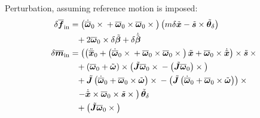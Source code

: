 \documentclass[10pt,dvips,fleqn,subeqn]{report}
\newcommand{\T}[1]{\bm{#1}}
\newcommand{\TT}[1]{\bm{#1}}
\begin{document}
Perturbation, assuming reference motion is imposed:
\begin{subequations}
\begin{align}
	\delta\overline{\T{f}}_{\text{in}}
	&= \plbr{
		\dot{\overline{\T{\omega}}}_0 \times{}
		+ \overline{\T{\omega}}_0 \times \overline{\T{\omega}}_0 \times{}
	} \plbr{
		m \delta\tilde{\T{x}}
		- \tilde{\T{s}} \times \tilde{\T{\theta}}_{\delta}
	}
	\noindent \\
	&\hphantom{=}+ 2 \overline{\T{\omega}}_0 \times \delta\tilde{\T{\beta}}
	+ \delta \dot{\tilde{\T{\beta}}} \\
%
	\delta\overline{\T{m}}_{\text{in}}
	&= \lplbr{
		\plbr{
			\ddot{\overline{\T{x}}}_0
			+ \plbr{
				\dot{\overline{\T{\omega}}}_0 \times{}
				+ \overline{\T{\omega}}_0 \times \overline{\T{\omega}}_0 \times{}
			} \tilde{\T{x}}
			+ \overline{\T{\omega}}_0 \times \dot{\tilde{\T{x}}}
		} \times \tilde{\T{s}} \times{}
	} \nonumber \\
	&\hphantom{=}
		+ \plbr{
			\overline{\T{\omega}}_0
			+ \tilde{\T{\omega}}
		} \times \plbr{
			\tilde{\TT{J}} \overline{\T{\omega}}_0 \times{}
			- \plbr{\tilde{\TT{J}} \overline{\T{\omega}}_0} \times{}
		}
	\nonumber \\
	&\hphantom{=}
		+ \tilde{\TT{J}} \plbr{
			\dot{\overline{\T{\omega}}}_0
			+ \overline{\T{\omega}}_0 \times \tilde{\T{\omega}}
		} \times{}
		- \plbr{\tilde{\TT{J}} \plbr{
			\dot{\overline{\T{\omega}}}_0
			+ \overline{\T{\omega}}_0 \times \tilde{\T{\omega}}
		}} \times{}
	\nonumber \\
	&\hphantom{=}
	\rplbr{
		- \dot{\tilde{\T{x}}} \times \overline{\T{\omega}}_0 \times \tilde{\T{s}} \times{}
	} \tilde{\T{\theta}}_{\delta}
	\nonumber \\
	&\hphantom{=}
	+ \plbr{
		\tilde{\TT{J}} \overline{\T{\omega}}_0 \times{}
}
\end{align}
\end{subequations}
\end{document}
